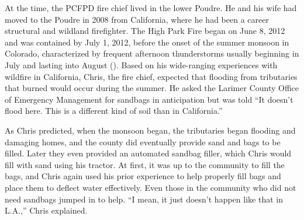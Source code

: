 \documentclass[
]{article}
\begin{document}
At the time, the PCFPD fire chief lived in the lower Poudre. He and his wife had moved to the Poudre in 2008 from California, where he had been a career structural and wildland firefighter. The High Park Fire began on June 8, 2012 and was contained by July 1, 2012, before the onset of the summer monsoon in Colorado, characterized by frequent afternoon thunderstorms usually beginning in July and lasting into August (). Based on his wide-ranging experiences with wildfire in California, Chris, the fire chief, expected that flooding from tributaries that burned would occur during the summer. He asked the Larimer County Office of Emergency Management for sandbags in anticipation but was told ``It doesn't flood here. This is a different kind of soil than in California.''

As Chris predicted, when the monsoon began, the tributaries began flooding and damaging homes, and the county did eventually provide sand and bags to be filled. Later they even provided an automated sandbag filler, which Chris would fill with sand using his tractor. At first, it was up to the community to fill the bags, and Chris again used his prior experience to help properly fill bags and place them to deflect water effectively. Even those in the community who did not need sandbags jumped in to help. ``I mean, it just doesn't happen like that in L.A.,'' Chris explained.
\end{document}
